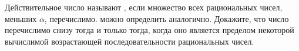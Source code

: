 Действительное число называют , если множество всех рациональных чисел,
меньших $\alpha$, перечислимо.  можно определить аналогично. Докажите, что
число перечислимо снизу тогда и только тогда, когда оно является пределом некоторой вычислимой
возрастающей последовательности рациональных чисел.